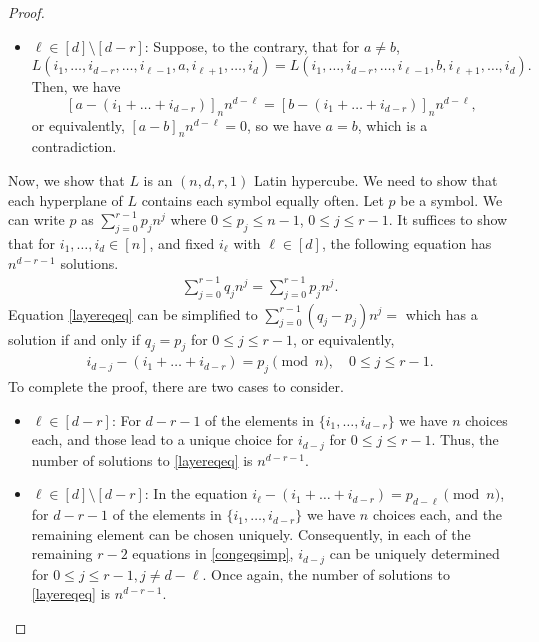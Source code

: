 \documentclass[11pt,oneside]{amsart}
\begin{document}
{\begin{proof}
\begin{itemize}
Then, we have 
$$
[a-b]_n n^{r-1} + [a-b]_n n^{r-2} +\dots+[a-b]_n n +[a-b]_n  =0. 
$$
so $a=b$, which is a contradiction.
    \item $\ell\in [d] \setminus[d-r]$: Suppose, to the contrary, that  for $a\neq b$,
    $$L(i_1,\dots, i_{d-r},\dots, i_{\ell-1}, a, i_{\ell+1},\dots,i_d)=L(i_1,\dots, i_{d-r},\dots, i_{\ell-1}, b, i_{\ell+1},\dots,i_d).$$ 
Then, we have 
 $$ 
 \left[a-(i_1+\dots+i_{d-r})\right]_n n^{d-\ell}=\left[b-(i_1+\dots+i_{d-r})\right]_n n^{d-\ell}, %
 $$
or equivalently, $[a-b]_n n^{d-\ell}=0$, so we have $a=b$, which is a contradiction.
\end{itemize}
Now, we show that $L$ is an $(n,d,r,1)$ Latin hypercube. We need to show that each hyperplane of $L$ contains each symbol equally often.  Let $p$ be a symbol. We can write $p$ as $\sum_{j=0}^{r-1} p_j n^j$ where $0\leq p_j \leq n-1$, $0\leq j\leq r-1$. It suffices to show that for $i_1,\dots,i_d \in [n]$, and fixed $i_\ell$ with $\ell\in [d]$, the following equation has $n^{d-r-1}$ solutions.
\begin{align}\label{layereqeq}
 \sum_{j=0}^{r-1}
q_j n^{j}=\sum_{j=0}^{r-1} p_j n^j.
\end{align}  
Equation \eqref{layereqeq} can be simplified to $\sum_{j=0}^{r-1}
(q_j-p_j) n^{j}=$ which has a solution if and only if $q_j=p_j$ for $0\leq j\leq r-1$, or equivalently, 
\begin{align} \label{congeqsimp}
    i_{d-j} - (i_1+\dots+i_{d-r})=p_j \pmod{n},  \quad 0\leq j\leq r-1.
\end{align}
To complete the proof, there are two cases to consider.
\begin{itemize}
    \item $\ell\in [d-r]$: For $d-r-1$ of the elements in $\{i_1,\dots,i_{d-r}\}$ we have $n$ choices each, and those lead to a unique choice for $i_{d-j}$ for $0\leq j\leq r-1$. Thus, the number of solutions to \eqref{layereqeq} is $n^{d-r-1}$.
    \item  $\ell\in [d]\setminus[d-r]$: In the equation $i_{\ell} - (i_1+\dots+i_{d-r})=p_{d-\ell} \pmod{n}$, for $d-r-1$ of the elements in $\{i_1,\dots,i_{d-r}\}$ we have $n$ choices each, and the remaining element can be chosen uniquely. Consequently, in each of the remaining $r-2$ equations in \eqref{congeqsimp}, $i_{d-j}$ can be uniquely determined for $0\leq j\leq r-1,j\neq d-\ell$. Once again, the number of solutions to \eqref{layereqeq} is $n^{d-r-1}$.
\end{itemize}
\end{proof}




}
\end{document}
